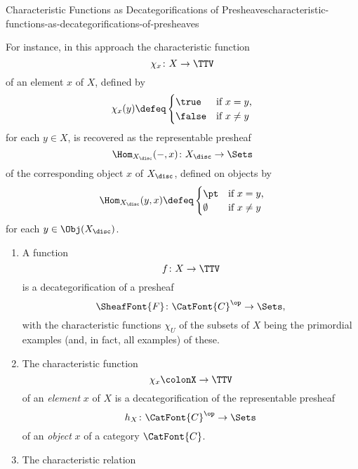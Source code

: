 \begin{remark}{Characteristic Functions as Decategorifications of Presheaves}{characteristic-functions-as-decategorifications-of-presheaves}
{        For instance, in this approach the characteristic function
        \[
            \chi_{x}
            \colon
            X
            \to
            \TTV
        \]%
        of an element $x$ of $X$, defined by
        \[
            \chi_{x}(y)
            \defeq
            \begin{cases}
                \true  &\text{if $x=y$,}\\
                \false &\text{if $x\neq y$}
            \end{cases}
        \]%
        for each $y\in X$, is recovered as the representable presheaf
        \[
            \Hom_{X_{\disc}}(-,x)
            \colon
            X_{\disc}
            \to
            \Sets
        \]%
        of the corresponding object $x$ of $X_{\disc}$, defined on objects by
        \[
            \Hom_{X_{\disc}}(y,x)
            \defeq
            \begin{cases}
                \pt       &\text{if $x=y$,}\\
                \emptyset &\text{if $x\neq y$}
            \end{cases}
        \]%
        for each $y\in\Obj(X_{\disc})$.
        \par\vspace*{-1.75\baselineskip}
    }%
    \begin{enumerate}
        \item\label{characteristic-functions-as-decategorifications-of-presheaves-functions}A function
            \[
                f\colon X\to\TTV%
            \]%
            is a decategorification of a presheaf%
            \[%
                \SheafFont{F}\colon\CatFont{C}^{\op}\to\Sets,%
            \]%
            with the characteristic functions $\chi_{U}$ of the subsets of $X$ being the primordial examples (and, in fact, all examples) of these.
        \item\label{characteristic-functions-as-decategorifications-of-presheaves-characteristic-functions}The characteristic function%
            \[%
                \chi_{x}%
                \colon%
                X%
                \to%
                \TTV%
            \]%
            of an \emph{element} $x$ of $X$ is a decategorification of the representable presheaf
            \[
                h_{X}%
                \colon%
                \CatFont{C}^{\op}
                \to%
                \Sets%
            \]%
            of an \emph{object} $x$ of a category $\CatFont{C}$.
        \item\label{characteristic-functions-as-decategorifications-of-presheaves-characteristic-relations}The characteristic relation%

\end{enumerate}
\end{remark}
